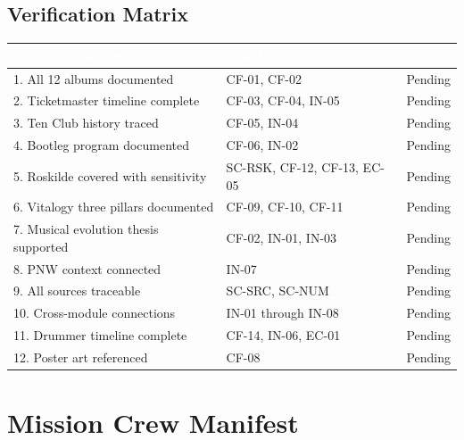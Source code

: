 \documentclass[11pt,letterpaper]{article}
\newcommand{\tableheader}[1]{\textbf{\sffamily\textcolor{white}{#1}}}
\begin{document}
\subsection{Verification Matrix}

\begin{center}
\begin{tabularx}{\textwidth}{XL{3.5cm}C{1.5cm}}
\toprule
{}
\tableheader{Success Criterion} & \tableheader{Test ID(s)} & \tableheader{Status} \\
. All 12 albums documented & CF-01, CF-02 & Pending \\
2. Ticketmaster timeline complete & CF-03, CF-04, IN-05 & Pending \\
3. Ten Club history traced & CF-05, IN-04 & Pending \\
4. Bootleg program documented & CF-06, IN-02 & Pending \\
5. Roskilde covered with sensitivity & SC-RSK, CF-12, CF-13, EC-05 & Pending \\
6. Vitalogy three pillars documented & CF-09, CF-10, CF-11 & Pending \\
7. Musical evolution thesis supported & CF-02, IN-01, IN-03 & Pending \\
8. PNW context connected & IN-07 & Pending \\
9. All sources traceable & SC-SRC, SC-NUM & Pending \\
10. Cross-module connections & IN-01 through IN-08 & Pending \\
11. Drummer timeline complete & CF-14, IN-06, EC-01 & Pending \\
12. Poster art referenced & CF-08 & Pending \\
\bottomrule
\end{tabularx}
\end{center}

\section{Mission Crew Manifest}
\end{document}
